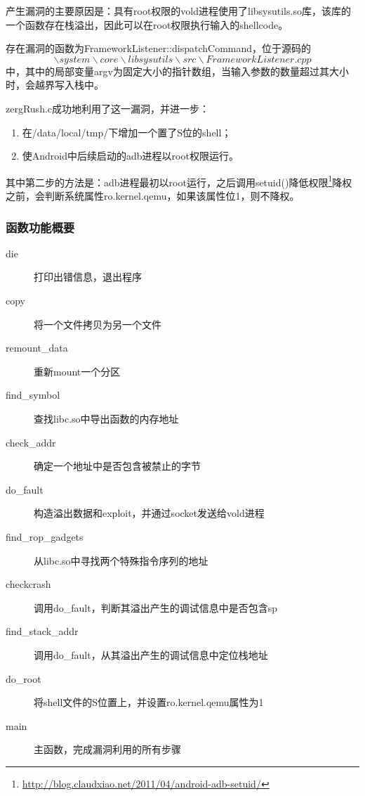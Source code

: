 产生漏洞的主要原因是：具有root权限的vold进程使用了libsysutils.so库，该库的一个函数存在栈溢出，因此可以在root权限执行输入的shellcode。

存在漏洞的函数为FrameworkListener::dispatchCommand，位于源码的$$\backslash system\backslash core\backslash libsysutils\backslash src\backslash FrameworkListener.cpp$$中，其中的局部变量argv为固定大小的指针数组，当输入参数的数量超过其大小时，会越界写入栈中。

zergRush.c成功地利用了这一漏洞，并进一步：
\begin{enumerate}
\item 在/data/local/tmp/下增加一个置了S位的shell；
\item 使Android中后续启动的adb进程以root权限运行。
\end{enumerate}

其中第二步的方法是：adb进程最初以root运行，之后调用setuid()降低权限\footnote{\url{http://blog.claudxiao.net/2011/04/android-adb-setuid/}}降权之前，会判断系统属性ro.kernel.qemu，如果该属性位1，则不降权。

\subsubsection{函数功能概要}
\begin{description}
\item[die] 打印出错信息，退出程序
\item[copy] 将一个文件拷贝为另一个文件
\item[remount\_data] 重新mount一个分区
\item[find\_symbol] 查找libc.so中导出函数的内存地址
\item[check\_addr] 确定一个地址中是否包含被禁止的字节
\item[do\_fault] 构造溢出数据和exploit，并通过socket发送给vold进程
\item[find\_rop\_gadgets] 从libc.so中寻找两个特殊指令序列的地址
\item[checkcrash] 调用do\_fault，判断其溢出产生的调试信息中是否包含sp
\item[find\_stack\_addr] 调用do\_fault，从其溢出产生的调试信息中定位栈地址
\item[do\_root] 将shell文件的S位置上，并设置ro.kernel.qemu属性为1
\item[main] 主函数，完成漏洞利用的所有步骤
\end{description}

